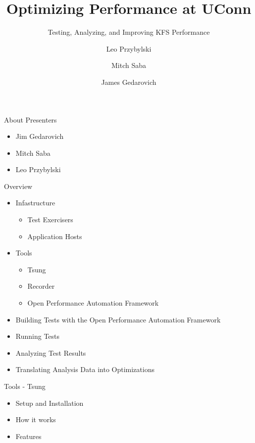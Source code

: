 \documentclass[xcolor=dvipsnames,14pt]{beamer}
\begin{document}
\title[A short proof]{Optimizing Performance at UConn}
\subtitle[Errors]{Testing, Analyzing, and Improving KFS Performance}
\author[Leo]{Leo Przybylski  \and Mitch Saba  \and James Gedarovich }



\begin{frame}[plain]
  \titlepage
\end{frame}

\begin{frame}{About Presenters}
  \begin{itemize}
    \item Jim Gedarovich
    \item Mitch Saba
    \item Leo Przybylski
  \end{itemize}
\end{frame}

\begin{frame}{Overview}
  \begin{itemize}
    \item Infastructure 
      \begin{itemize}
        \item Test Exercisers
        \item Application Hosts
      \end{itemize}
    \item Tools 
      \begin{itemize}
        \item Tsung
        \item Recorder
        \item Open Performance Automation Framework
      \end{itemize}
    \item Building Tests with the Open Performance Automation Framework
    \item Running Tests
    \item Analyzing Test Results
    \item Translating Analysis Data into Optimizations
  \end{itemize}
\end{frame}

\begin{frame}{Tools - Tsung}
  \begin{itemize}
    \item Setup and Installation
    \item How it works
    \item Features
  \end{itemize}
\end{frame}
\end{document}
